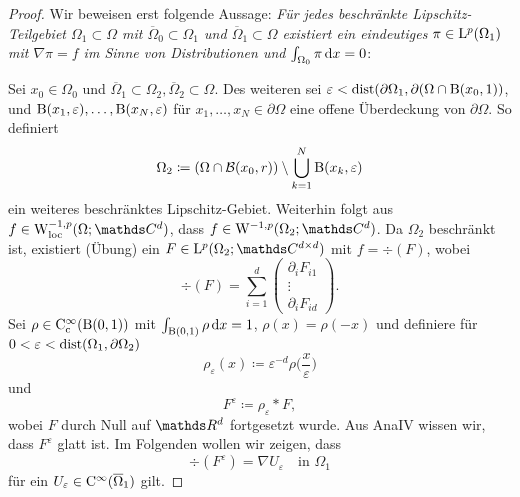 \begin{proof}
  Wir beweisen erst folgende Aussage: \emph{Für jedes beschränkte Lipschitz-Teilgebiet $\Omega_1 \subset \Omega$ mit $\overline\Omega_0 \subset \Omega_1$ und $\overline\Omega_1 \subset \Omega$ existiert ein eindeutiges $\pi \in \mathrm{L}^p(\Omega_1)$ mit $\nabla\pi = f$ im Sinne von Distributionen und $\int_{\Omega_0} \pi \, {\operatorname{d}\!{x}} = 0$\;}:

  Sei $x_0 \in \Omega_0$ und $\overline\Omega_1 \subset \Omega_2, \overline\Omega_2 \subset \Omega$.
  Des weiteren sei $\varepsilon < \operatorname{dist}(\partial\Omega_1, \partial(\Omega \cap \mathrm{B}(x_0,1))$, und $\mathrm{B}(x_1,\varepsilon),\dots,\mathrm{B}(x_N,\varepsilon)$ für $x_1,\dots,x_N \in \partial\Omega$ eine offene Überdeckung von $\partial\Omega$.
  So definiert
  $$
  \Omega_2 \coloneqq (\Omega \cap \mathcal{B}(x_0, r)) \setminus \bigcup_{k = 1}^N \mathrm{B}(x_k , \varepsilon)
  $$
  ein weiteres beschränktes Lipschitz-Gebiet.
  Weiterhin folgt aus $f \in \WW_{\loc}^{-1,p}(\Omega; \C^d)$, dass $f \in \WW^{-1,p}(\Omega_2; \C^d)$.
  Da $\Omega_2$ beschränkt ist, existiert (Übung) ein $F \in \Ell^p(\Omega_2; \C^{d\times d})$ mit $f = \div(F)$, wobei
  $$
  \div(F) = \sum_{i = 1}^d \left( \begin{array}{c} \partial_i F_{i1} \\ \vdots \\ \partial_i F_{id} \end{array} \right).
  $$
  Sei $\rho \in \mathrm{C}_{\mathrm{c}}^\infty(\mathrm{B}(0,1))$ mit $\int_{\mathrm{B}(0,1)} \rho \, {\operatorname{d}\!{x}} = 1$, $\rho(x) = \rho(-x)$ und definiere für $0 < \varepsilon < \operatorname{dist}(\Omega_1, \partial\Omega_2)$
  $$
  \rho_\varepsilon(x) \coloneqq \varepsilon^{-d} \rho\Big(\frac{x}{\varepsilon}\Big)
  $$
  und
  $$
  F^\varepsilon \coloneqq \rho_\varepsilon \ast F,
  $$
  wobei $F$ durch Null auf $\R^d$ fortgesetzt wurde.
  Aus AnaIV wissen wir, dass $F^\varepsilon$ glatt ist.
  Im Folgenden wollen wir zeigen, dass 
  $$
  \div(F^\varepsilon) = \nabla U_\varepsilon \quad\text{in } \Omega_1
  $$
  für ein $U_\varepsilon \in \mathrm{C}^\infty(\overline\Omega_1)$ gilt.


\end{proof}
